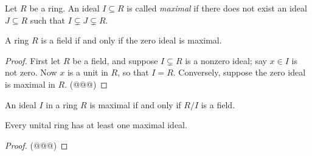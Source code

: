 \begin{dfn}
Let \(R\) be a ring.
An ideal \(I \subseteq R\) is called \emph{maximal} if there does not exist an ideal \(J \subseteq R\) such that \(I \subsetneq J \subsetneq R\).
\end{dfn}

\begin{prop}
A ring \(R\) is a field if and only if the zero ideal is maximal.
\end{prop}

\begin{proof}
First let \(R\) be a field, and suppose \(I \subsetneq R\) is a nonzero ideal; say \(x \in I\) is not zero.
Now \(x\) is a unit in \(R\), so that \(I = R\).
Conversely, suppose the zero ideal is maximal in \(R\).
(@@@)
\end{proof}

\begin{prop}
An ideal \(I\) in a ring \(R\) is maximal if and only if \(R/I\) is a field.
\end{prop}

\begin{prop}[Krull]
Every unital ring has at least one maximal ideal.
\end{prop}

\begin{proof}
(@@@)
\end{proof}
